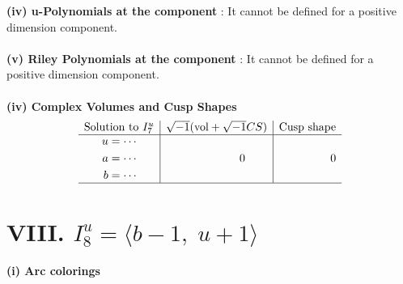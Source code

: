\documentclass[1p]{elsarticle_modified}
\theoremstyle{definition}
\newcommand{\I}{\sqrt{-1}}
\begin{document}
\flushleft \textbf{(iv) u-Polynomials at the component} : It cannot be defined for a positive dimension component.\\~\\
\flushleft \textbf{(v) Riley Polynomials at the component} : It cannot be defined for a positive dimension component.\\~\\
\newpage\flushleft \textbf{(iv) Complex Volumes and Cusp Shapes}
$$\begin{array}{c|c|c} 
\text{Solution to }I^u_{7}& \I (\text{vol} + \sqrt{-1}CS) & \text{Cusp shape}\\
 \hline 
\begin{aligned}
u &= \cdots \\
a &= \cdots \\
b &= \cdots\end{aligned}
 & \phantom{-0.000000 } 0 & \phantom{-0.000000 } 0\\
 \hline 
 \end{array}
$$\newpage\renewcommand{\arraystretch}{1}
\centering \section*{VIII. $I^u_{8}= \langle b-1,\;u+1 \rangle$}
\flushleft \textbf{(i) Arc colorings}\\
\end{document}
